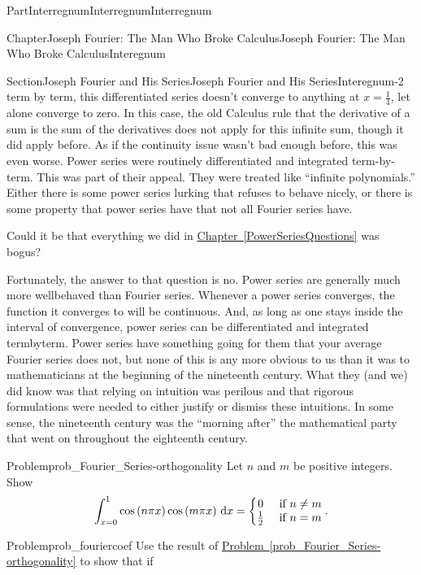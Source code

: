 \documentclass[oneside,10pt,]{book}
\newcommand{\xreffont}{\relax}
\numberwithin{equation}{part}
\newcommand{\dx}[1]{\,{\rm d}#1}
\newcommand{\amp}{&}
\begin{document}
\begin{partptx}{Part}{Interregnum}{}{Interregnum}{}{}{Interregnum}
\begin{chapterptx}{Chapter}{Joseph Fourier: The Man Who Broke Calculus}{}{Joseph Fourier: The Man Who Broke Calculus}{}{}{Interegnum}
\begin{sectionptx}{Section}{Joseph Fourier and His Series}{}{Joseph Fourier and His Series}{}{}{Interegnum-2}
term by term, this differentiated series doesn't converge to anything at \(x=\frac{1}{4}\), let alone converge to zero. In this case, the old Calculus rule that the derivative of a sum is the sum of the derivatives does not apply for this infinite sum, though it did apply before. As if the continuity issue wasn't bad enough before, this was even worse. Power series were routinely differentiated and integrated term-by-term. This was part of their appeal. They were treated like ``infinite polynomials.'' Either there is some power series lurking that refuses to behave nicely, or there is some property that power series have that not all Fourier series have.%
\par
Could it be that everything we did in \hyperref[PowerSeriesQuestions]{Chapter~{\xreffont\ref{PowerSeriesQuestions}}} was bogus?%
\par
Fortunately, the answer to that question is no.  Power series are generally much more well\textendash{}behaved than Fourier series. Whenever a power series converges, the function it converges to will be continuous.  And, as long as one stays inside the interval of convergence, power series can be differentiated and integrated term\textendash{}by\textendash{}term.  Power series have something going for them that your average Fourier series does not, but none of this is any more obvious to us than it was to mathematicians at the beginning of the nineteenth century.  What they (and we) did know was that relying on intuition was perilous and that rigorous formulations were needed to either justify or dismiss these intuitions.  In some sense, the nineteenth century was the ``morning after'' the mathematical party that went on throughout the eighteenth century.%
\begin{problem}{Problem}{}{prob_Fourier_Series-orthogonality}%
Let \(n\) and \(m\) be positive integers. Show%
\begin{equation*}
\int_{x=0}^1\cos\left(n\pi x\right)\cos\left(m\pi x\right)\dx{ x}=\left\{ \begin{matrix}0\amp \text{ if } n\neq m\\ \frac{1}{2}\amp \text{ if } n=m \end{matrix} \right.\text{.}
\end{equation*}
%
\end{problem}
\begin{problem}{Problem}{}{prob_fouriercoef}%
 Use the result of \hyperref[prob_Fourier_Series-orthogonality]{Problem~{\xreffont\ref{prob_Fourier_Series-orthogonality}}} to show that if%

\end{problem}
\end{sectionptx}
\end{chapterptx}
\end{partptx}
\end{document}
